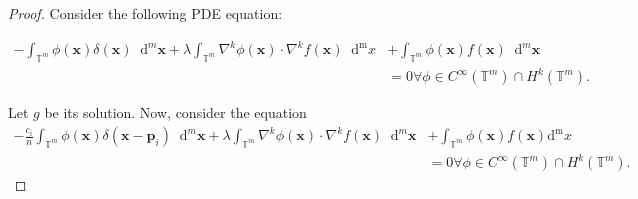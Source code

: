 \documentclass[multixcb]{amstext-l}
\theoremstyle{plain}
\theoremstyle{definition}
\theoremstyle{definition}
\theoremstyle{remark}
\numberwithin{equation}{chapter}
\begin{document}
\begin{proof}

Consider the following PDE equation:

\begin{equation}
\begin{aligned}
\label{sub_EL}
 -\int_{\mathbb{T}^m} \phi(\boldsymbol{x})\delta(\boldsymbol{x})\mathop{}\!\mathrm{d}^m\boldsymbol{x} + \lambda\int_{\mathbb{T}^m} \nabla^k\phi(\boldsymbol{x})\cdot\nabla^k f(\boldsymbol{x})\mathop{}\!\mathrm{d^m}x &+ \int_{\mathbb{T}^m} \phi(\boldsymbol{x})f(\boldsymbol{x})\mathop{}\!\mathrm{d}^m\boldsymbol{x}\\ &= 0 \forall \phi\in C^{\infty}(\mathbb{T}^m)\cap H^k(\mathbb{T}^m).    
\end{aligned}
\end{equation}
      
Let $g$ be its solution. Now, consider the equation 
\begin{equation}
\label{sub_EL_2}
    \begin{aligned}
        -\frac{c_i}{n}\int_{\mathbb{T}^m} \phi(\boldsymbol{x})\delta(\boldsymbol{x}-\boldsymbol{p}_i)\mathop{}\!\mathrm{d}^m\boldsymbol{x} + \lambda\int_{\mathbb{T}^m} \nabla^k\phi(\boldsymbol{x})\cdot\nabla^k f(\boldsymbol{x})\mathop{}\!\mathrm{d}^m\boldsymbol{x} &+ \int_{\mathbb{T}^m} \phi(\boldsymbol{x})f(\boldsymbol{x})\mathrm{d^m}x\\ &= 0 \forall \phi\in C^{\infty}(\mathbb{T}^m)\cap H^k(\mathbb{T}^m).  
    \end{aligned}
\end{equation}


\end{proof}
\end{document}
